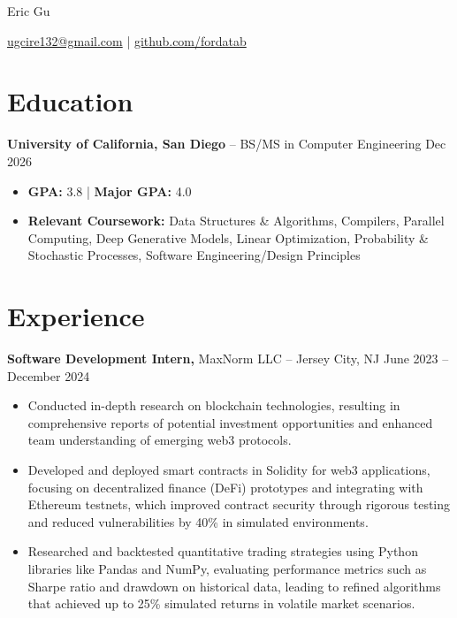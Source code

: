 \documentclass[11pt]{article}       %
\begin{document}
\centerline{\Huge Eric Gu}

\vspace{-4pt}

\centerline{\href{mailto:ugcire132@gmail.com}{ugcire132@gmail.com} |  \href{github.com/fordatab}{github.com/fordatab}}

\vspace{-18.5pt}

\section*{Education}
\textbf{University of California, San Diego} -- BS/MS in Computer Engineering  \hfill Dec 2026\begin{itemize}[leftmargin=*, nosep]
    \item \textbf{GPA:} 3.8 | \textbf{Major GPA:} 4.0
    \item \textbf{Relevant Coursework:} Data Structures \& Algorithms, Compilers, Parallel Computing, Deep Generative Models, Linear Optimization, Probability \& Stochastic Processes, Software Engineering/Design Principles
\end{itemize}


\vspace{-18.5pt}

\section*{Experience}
\textbf{Software Development Intern,} {MaxNorm LLC} -- Jersey City, NJ \hfill June 2023 -- December 2024 \
\vspace{-9pt}
\begin{itemize}
\item Conducted in-depth research on blockchain technologies, resulting in comprehensive reports of potential investment opportunities and enhanced team understanding of emerging web3 protocols.
\item Developed and deployed smart contracts in Solidity for web3 applications, focusing on decentralized finance (DeFi) prototypes and integrating with Ethereum testnets, which improved contract security through rigorous testing and reduced vulnerabilities by 40\% in simulated environments.
\item Researched and backtested quantitative trading strategies using Python libraries like Pandas and NumPy, evaluating performance metrics such as Sharpe ratio and drawdown on historical data, leading to refined algorithms that achieved up to 25\% simulated returns in volatile market scenarios.
\end{itemize}
\end{document}
